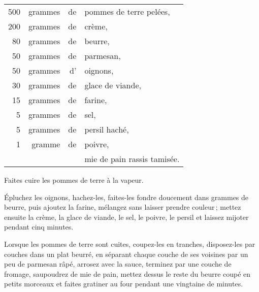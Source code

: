\footnotesize
\begin{longtable}{rrrp{18em}}
    500 & grammes & de & pommes de terre pelées,                                                          \\
    200 & grammes & de & crème,                                                                           \\
     80 & grammes & de & beurre,                                                                          \\
     50 & grammes & de & parmesan,                                                                        \\
     50 & grammes & d' & oignons,                                                                         \\
     30 & grammes & de & glace de viande,                                                                 \\
     15 & grammes & de & farine,                                                                          \\
      5 & grammes & de & sel,                                                                             \\
      5 & grammes & de & persil haché,                                                                    \\
      1 & gramme  & de & poivre,                                                                          \\
        &         &    & mie de pain rassis tamisée.                                                      \\
\end{longtable}
\normalsize

Faites cuire les pommes de terre à la vapeur.

Épluchez les oignons, hachez-les, faites-les fondre doucement dans {\mmm}
grammes de beurre, puis ajoutez la farine, mélangez sans laisser prendre
couleur ; mettez ensuite la crème, la glace de viande, le sel, le poivre, le
persil et laissez mijoter pendant cinq minutes.

Lorsque les pommes de terre sont cuites, coupez-les en tranches, disposez-les
par couches dans un plat beurré, en séparant chaque couche de ses voisines par
un peu de parmesan râpé, arrosez avec la sauce, terminez par une couche de
fromage, saupoudrez de mie de pain, mettez dessus le reste du beurre coupé en
petits morceaux et faites gratiner au four pendant une vingtaine de minutes.

